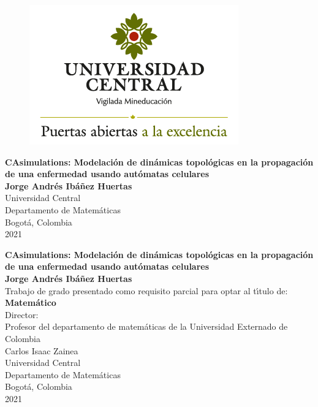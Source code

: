 \begin{center}
\begin{figure}
\centering%
\includegraphics[scale=0.4]{Imagenes/logo_1.png}
\end{figure}
\thispagestyle{empty} \vspace*{2.0cm} \textbf{\huge
CAsimulations: Modelación de dinámicas topológicas en la propagación de una enfermedad usando autómatas celulares}\\[6.0cm]
\Large\textbf{Jorge Andrés Ibáñez Huertas}\\[4.0cm]
\small Universidad Central\\
Departamento de Matemáticas\\
Bogotá, Colombia\\
2021\\
\end{center}

\newpage{\pagestyle{empty}\cleardoublepage}

\newpage
\begin{center}
\thispagestyle{empty} \vspace*{0cm} \textbf{\huge
CAsimulations: Modelación de dinámicas topológicas en la propagación de una enfermedad usando autómatas celulares}\\[3.5cm]
\Large\textbf{Jorge Andrés Ibáñez Huertas}\\[3.0cm]
\small Trabajo de grado presentado como requisito parcial para optar al
t\'{\i}tulo de:\\
\textbf{Matemático}\\[3.0cm]
Director:\\
Profesor del departamento de matemáticas de la Universidad Externado de Colombia \\ Carlos Isaac Zainea\\[3.5cm]
Universidad Central\\
Departamento de Matemáticas\\
Bogotá, Colombia\\
2021\\
\end{center}

